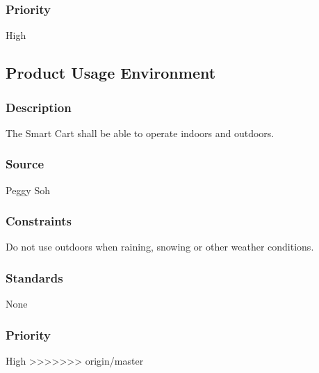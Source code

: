 \subsubsection{Priority}
High


\subsection{Product Usage Environment}
\subsubsection{Description}
The Smart Cart shall be able to operate indoors and outdoors. 
\subsubsection{Source}
Peggy Soh
\subsubsection{Constraints}
Do not use outdoors when raining, snowing or other weather conditions.
\subsubsection{Standards}
None
\subsubsection{Priority}
High
>>>>>>> origin/master
